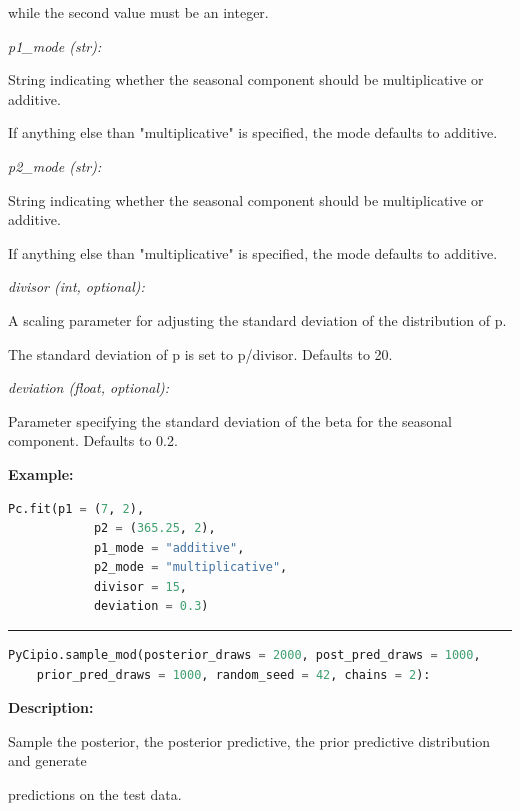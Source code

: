 \documentclass{article}
\begin{document}
\indent \indent \indent while the second value must be an integer.

\indent \indent \textit{p1\_mode (str):} 

\indent \indent \indent String indicating whether the seasonal component should be
multiplicative or additive. 

\indent \indent \indent If anything else than "multiplicative" is specified,
the mode defaults to additive.

\indent \indent \textit{p2\_mode (str):} 

\indent \indent \indent String indicating whether the seasonal component should be
multiplicative or additive. 

\indent \indent \indent If anything else than "multiplicative" is specified,
the mode defaults to additive.

\indent \indent \textit{divisor (int, optional):} 

\indent \indent \indent A scaling parameter for adjusting the standard deviation of the distribution
of p. 

\indent \indent \indent The standard deviation of p is set to p/divisor. Defaults to 20. 

\indent \indent \textit{deviation (float, optional):} 

\indent \indent \indent Parameter specifying the standard deviation of the beta for the seasonal
component. Defaults to 0.2.

\indent \textbf{Example:}

\begin{lstlisting}[language=Python]
        Pc.fit(p1 = (7, 2), 
            p2 = (365.25, 2), 
            p1_mode = "additive", 
            p2_mode = "multiplicative", 
            divisor = 15, 
            deviation = 0.3)    
\end{lstlisting}


\hrule

\begin{lstlisting}[language=Python]
    PyCipio.sample_mod(posterior_draws = 2000, post_pred_draws = 1000, 
    prior_pred_draws = 1000, random_seed = 42, chains = 2):
\end{lstlisting}

\indent \textbf{Description:} 

\indent \indent Sample the posterior, the posterior predictive, the prior predictive distribution and generate 

\indent \indent predictions on the test data.
\end{document}
